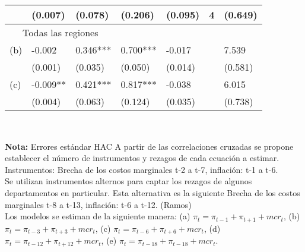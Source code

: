 \begin{table}[H]
\begin{tabular}{lllllll}
& \scriptsize{(0.007)} & \scriptsize{(0.078)} & \scriptsize{(0.206)} & \scriptsize{(0.095)} & \scriptsize{4}     & \scriptsize{(0.649)} \\
\hline \multicolumn{3}{c}{Todas las regiones} &       &       &       &  \\
\vspace{-0.3cm} (b) & -0.002 & 0.346*** & 0.700*** & -0.017 &       & 7.539\\   
& \scriptsize{(0.001)} & \scriptsize{(0.035)} & \scriptsize{(0.050)} & \scriptsize{(0.014)} &       & \scriptsize{(0.581)} \\
\vspace{-0.3cm} (c) & -0.009** & 0.421*** & 0.817*** & -0.038 &       & 6.015\\   
& \scriptsize{(0.004)} & \scriptsize{(0.063)} & \scriptsize{(0.124)} & \scriptsize{(0.035)} &       & \scriptsize{(0.738)} \\
\hline
\end{tabular}
\label{tab:addlabel}\\
\raggedright  \scriptsize \textbf{Nota:} Errores estándar HAC  A partir de las correlaciones cruzadas se propone establecer el número de instrumentos y rezagos de cada ecuación a estimar.\\
Instrumentos: Brecha de los costos marginales t-2 a t-7, inflación: t-1 a t-6.\\
\dag Se utilizan instrumentos alternos para captar los rezagos de algunos departamentos en particular. Esta alternativa es la siguiente Brecha de los costos marginales t-8 a t-13, inflación: t-6 a t-12.   (Ramos)\\
Los modelos se estiman de la siguiente manera: (a) $\pi_{t}=\pi_{t-1}+\pi_{t+1}+mcr_{t}$, (b) $\pi_{t}=\pi_{t-3}+\pi_{t+3}+mcr_{t}$, (c) $\pi_{t}=\pi_{t-6}+\pi_{t+6}+mcr_{t}$, (d) $\pi_{t}=\pi_{t-12}+\pi_{t+12}+mcr_{t}$, (e) $\pi_{t}=\pi_{t-18}+\pi_{t-18}+mcr_{t}$.
\end{table}%




